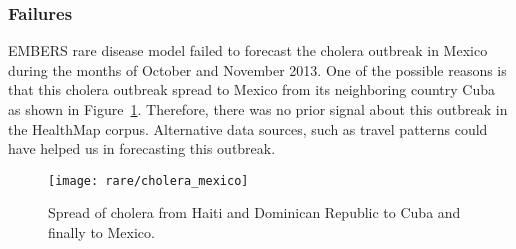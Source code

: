 \subsubsection{Failures}

EMBERS rare disease model failed to forecast the cholera outbreak in Mexico
during the months of October and November 2013. One of the possible reasons is
that this cholera outbreak spread to Mexico from its neighboring country Cuba
as shown in Figure~\ref{fig:cholera_mexico}. Therefore, there was no prior
signal about this outbreak in the HealthMap corpus. Alternative data sources,
such as travel patterns could have helped us in forecasting this outbreak.

\begin{figure}
  \texttt{[image: rare/cholera\_mexico]}
  \caption{\label{fig:cholera_mexico} Spread of cholera from Haiti and
  Dominican Republic to Cuba and finally to Mexico.}
\end{figure}
